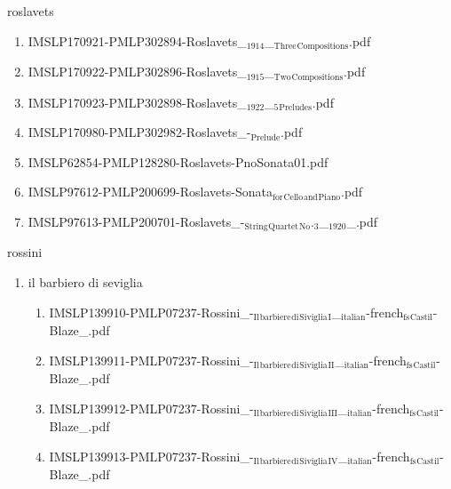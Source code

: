 \documentclass[11pt]{article}
\begin{document}
\item roslavets
\label{sec-1-1-1-1-44-55}
\begin{enumerate}
\item IMSLP170921-PMLP302894-Roslavets\_$_{\text{1914}}$\_$_{\text{Three}}$$_{\text{Compositions}}$.pdf
\label{sec-1-1-1-1-44-55-1}

\item IMSLP170922-PMLP302896-Roslavets\_$_{\text{1915}}$\_$_{\text{Two}}$$_{\text{Compositions}}$.pdf
\label{sec-1-1-1-1-44-55-2}

\item IMSLP170923-PMLP302898-Roslavets\_$_{\text{1922}}$\_$_{\text{5}}$$_{\text{Preludes}}$.pdf
\label{sec-1-1-1-1-44-55-3}

\item IMSLP170980-PMLP302982-Roslavets\_-$_{\text{Prelude}}$.pdf
\label{sec-1-1-1-1-44-55-4}

\item IMSLP62854-PMLP128280-Roslavets-PnoSonata01.pdf
\label{sec-1-1-1-1-44-55-5}

\item IMSLP97612-PMLP200699-Roslavets-Sonata$_{\text{for}}$$_{\text{Cello}}$$_{\text{and}}$$_{\text{Piano}}$.pdf
\label{sec-1-1-1-1-44-55-6}

\item IMSLP97613-PMLP200701-Roslavets\_-$_{\text{String}}$$_{\text{Quartet}}$$_{\text{No}}$.$_{\text{3}}$\_$_{\text{1920}}$\_.pdf
\label{sec-1-1-1-1-44-55-7}
\end{enumerate}

\item rossini
\label{sec-1-1-1-1-44-56}
\begin{enumerate}
\item il barbiero di seviglia
\label{sec-1-1-1-1-44-56-1}
\begin{enumerate}
\item IMSLP139910-PMLP07237-Rossini\_-$_{\text{Il}}$$_{\text{barbiere}}$$_{\text{di}}$$_{\text{Siviglia}}$$_{\text{I}}$\_$_{\text{italian}}$-french$_{\text{fs}}$$_{\text{Castil}}$-Blaze\_.pdf
\label{sec-1-1-1-1-44-56-1-1}

\item IMSLP139911-PMLP07237-Rossini\_-$_{\text{Il}}$$_{\text{barbiere}}$$_{\text{di}}$$_{\text{Siviglia}}$$_{\text{II}}$\_$_{\text{italian}}$-french$_{\text{fs}}$$_{\text{Castil}}$-Blaze\_.pdf
\label{sec-1-1-1-1-44-56-1-2}

\item IMSLP139912-PMLP07237-Rossini\_-$_{\text{Il}}$$_{\text{barbiere}}$$_{\text{di}}$$_{\text{Siviglia}}$$_{\text{III}}$\_$_{\text{italian}}$-french$_{\text{fs}}$$_{\text{Castil}}$-Blaze\_.pdf
\label{sec-1-1-1-1-44-56-1-3}

\item IMSLP139913-PMLP07237-Rossini\_-$_{\text{Il}}$$_{\text{barbiere}}$$_{\text{di}}$$_{\text{Siviglia}}$$_{\text{IV}}$\_$_{\text{italian}}$-french$_{\text{fs}}$$_{\text{Castil}}$-Blaze\_.pdf
\label{sec-1-1-1-1-44-56-1-4}
\end{enumerate}
\end{enumerate}
\end{document}
